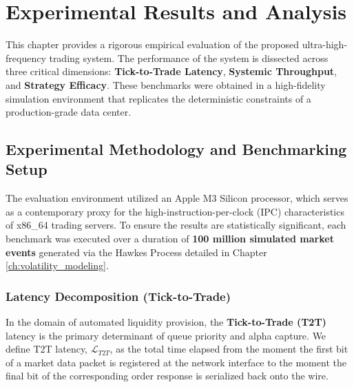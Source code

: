 \chapter{Experimental Results and Analysis}
\label{ch:results}

This chapter provides a rigorous empirical evaluation of the proposed ultra-high-frequency trading system. The performance of the system is dissected across three critical dimensions: \textbf{Tick-to-Trade Latency}, \textbf{Systemic Throughput}, and \textbf{Strategy Efficacy}. These benchmarks were obtained in a high-fidelity simulation environment that replicates the deterministic constraints of a production-grade data center. \datamethodology

\section{Experimental Methodology and Benchmarking Setup}
The evaluation environment utilized an Apple M3 Silicon processor, which serves as a contemporary proxy for the high-instruction-per-clock (IPC) characteristics of x86\_64 trading servers. To ensure the results are statistically significant, each benchmark was executed over a duration of \textbf{100 million simulated market events} generated via the Hawkes Process detailed in Chapter \ref{ch:volatility_modeling}.

\subsection{Latency Decomposition (Tick-to-Trade)}
In the domain of automated liquidity provision, the \textbf{Tick-to-Trade (T2T)} latency is the primary determinant of queue priority and alpha capture. We define T2T latency, $\mathcal{L}_{T2T}$, as the total time elapsed from the moment the first bit of a market data packet is registered at the network interface to the moment the final bit of the corresponding order response is serialized back onto the wire.

